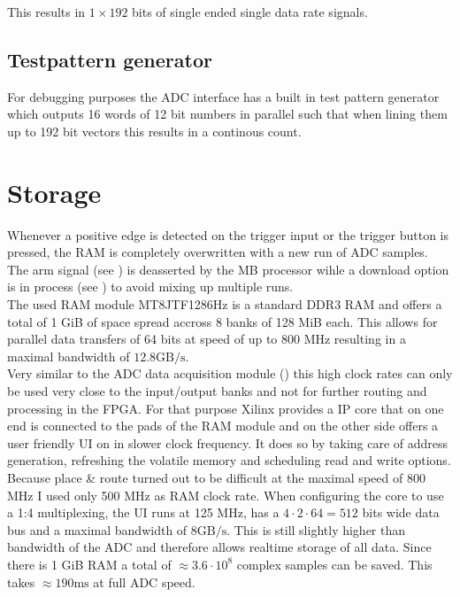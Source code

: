 This results in $1 \times 192$ bits of single ended single data rate signals. \\

\subsection{Testpattern generator}
For debugging purposes the \gls{ADC} interface has a built in test pattern
generator which outputs 16 words of 12 bit numbers in parallel such that
when lining them up to 192 bit vectors this results in a continous count.

\section{Storage}
\label{sec:fpga_storage}
Whenever a positive edge is detected on the trigger input or the trigger
button is pressed, the \gls{RAM} is completely overwritten with a new run of
\gls{ADC} samples. \\

The arm signal (see ) is deasserted
by the \gls{MB} processor wihle a download option is in process
(see ) to avoid mixing up multiple runs. \\

The used \gls{RAM} module MT8JTF1286Hz is a standard \acrshort{DDR}3 \gls{RAM}
and offers a total of 1 GiB of space spread accross 8 banks of 128 MiB each.
This allows for parallel data transfers of 64 bits at speed of up to 800 MHz
resulting in a maximal bandwidth of $12.8 \text{GB}/\text{s}$. \\

Very similar to the \gls{ADC} data acquisition module ()
this high clock rates can only be used very close to the input/output banks
and not for further routing and processing in the \gls{FPGA}.
For that purpose Xilinx provides a \gls{IP} core that on one end is connected
to the pads of the \gls{RAM} module and on the other side offers a user
friendly \gls{UI} on in slower clock frequency.
It does so by taking care of address generation, refreshing the volatile
memory and scheduling read and write options. \\

Because place \& route turned out to be difficult at the maximal speed
of 800 MHz I used only 500 MHz as \gls{RAM} clock rate.
When configuring the core to use a 1:4 multiplexing, the \gls{UI} runs
at 125 MHz, has a $4 \cdot 2 \cdot 64 = 512$ bits wide data bus
and a maximal bandwidth of $8 \text{GB}/\text{s}$. This is still slightly
higher than bandwidth of the \gls{ADC} and therefore allows realtime
storage of all data. Since there is 1 GiB \gls{RAM}
a total of $\approx 3.6 \cdot 10^8$ complex samples can be saved. This
takes $\approx 190 \text{ms}$ at full \gls{ADC} speed. \\

